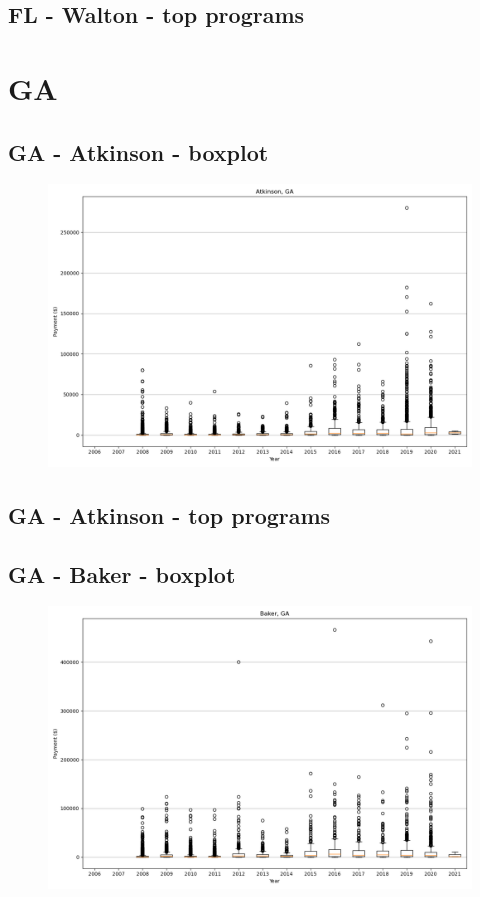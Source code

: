 \subsection*{FL - Walton - top programs}

\newpage
\section*{GA}
\subsection*{GA - Atkinson - boxplot}
\begin{figure}[h]
\centering
\includegraphics[width=7in]{../output/boxplots/counties/Atkinson-GA_boxplot.png}
\end{figure}


\subsection*{GA - Atkinson - top programs}

\newpage
\subsection*{GA - Baker - boxplot}
\begin{figure}[h]
\centering
\includegraphics[width=7in]{../output/boxplots/counties/Baker-GA_boxplot.png}
\end{figure}


